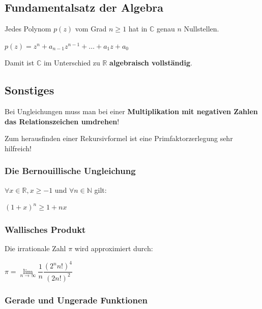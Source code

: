 \documentclass[a4paper, fontsize = 8pt, landscape]{scrartcl}
\newcommand{\R}[0]{\mathbb{R}}
\newcommand{\N}[0]{\mathbb{N}}
\begin{document}
\begin{multicols*}{3}
    \subsection{Fundamentalsatz der Algebra}

    Jedes Polynom $p(z)$ vom Grad $n \geq 1$ hat in $\mathbb{C}$ genau $n$ Nullstellen.

    \begin{center}
        $p(z) = z^n + a_{n-1}z^{n-1} + \dots + a_1 z + a_0$
    \end{center}

    Damit ist $\mathbb{C}$ im Unterschied zu $\R$ \textbf{algebraisch vollständig}.



    \subsection{Sonstiges}

    Bei Ungleichungen muss man bei einer \textbf{Multiplikation mit negativen Zahlen das Relationszeichen umdrehen}! \medskip

    Zum herausfinden einer Rekursivformel ist eine Primfaktorzerlegung sehr hilfreich!

    \subsubsection{Die Bernouillische Ungleichung}

    $\forall x \in \R, x \geq -1$ und $\forall n \in \N$ gilt:

    \begin{center}
        $(1 + x)^n \geq 1 + nx$
    \end{center}


    \subsubsection{Wallisches Produkt}

    Die irrationale Zahl $\pi$ wird approximiert durch:

    \begin{center}
        $\displaystyle \pi = \lim\limits_{n \to \infty} \dfrac{1}{n} \dfrac{(2^n n!)^4}{(2n!)^2}$
    \end{center}

    \subsubsection{Gerade und Ungerade Funktionen}


\end{multicols*}
\end{document}
